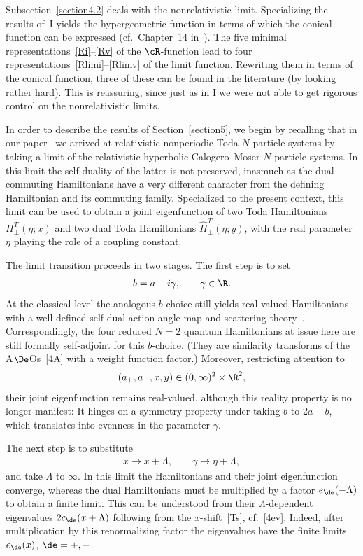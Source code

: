 \documentclass[pdftex]{sigma}
\numberwithin{equation}{section}
\begin{document}
Subsection~\ref{section4.2} deals with the nonrelativistic limit. Specializing the results of~I yields the hypergeometric function in terms of which the conical function can be expressed (cf.~Chapter~14 in~\cite{dlmf}). The f\/ive minimal representations~\eqref{Ri}--\eqref{Rv} of the $\cR$-function lead to four representations~\eqref{Rlimi}--\eqref{Rlimv} of the limit function. Rewriting them in terms of the conical function, three of these can be found in the literature (by looking rather hard). This is reassuring, since just as in I we were not able to get rigorous control on the nonrelativistic limits.

In order to describe the results of Section~\ref{section5}, we begin by recalling that in our paper~\cite{toda} we arrived at relativistic nonperiodic Toda $N$-particle systems by taking a limit of the relativistic hyperbolic Calogero--Moser $N$-particle systems. In this limit the self-duality of the latter is not preserved, inasmuch as the dual commuting Hamiltonians have a very dif\/ferent character from the def\/ining Hamiltonian and its commuting family. Specialized to the present context, this limit can be used to obtain a joint eigenfunction of two Toda Hamiltonians $H^{T}_{\pm}(\eta;x)$ and two dual Toda Hamiltonians $\hat{H}^{T}_{\pm}(\eta;y)$, with the real parameter $\eta$ playing the role of a coupling constant.

The limit transition proceeds in two stages. The f\/irst step is to set
\begin{gather}\label{gam}
b=a-i\gamma,\qquad \gamma\in\R.
\end{gather}
At the classical level the analogous $b$-choice still yields real-valued Hamiltonians with a well-def\/ined self-dual action-angle map and scattering theory~\cite{aa1}.  Correspondingly, the four reduced $N=2$ quantum Hamiltonians at issue here are still formally self-adjoint for this $b$-choice. (They are similarity transforms of the A$\De$Os~\eqref{4A} with a weight function factor.) Moreover, restricting attention to
\begin{gather}\label{real}
(a_{+},a_{-},x,y)\in(0,\infty)^2\times\R^2,
\end{gather}
their joint eigenfunction remains real-valued, although this reality property is no longer manifest: It hinges on a symmetry property under taking $b$ to $2a-b$, which translates into evenness in the parameter $\gamma$.

The next step is to substitute
\begin{gather}\label{Ts}
x\to x+\Lambda,\qquad \gamma\to \eta +\Lambda,
\end{gather}
and take $\Lambda$ to $\infty$. In this limit the Hamiltonians and their joint eigenfunction converge, whereas the dual Hamiltonians must be multiplied by a factor $e_{\de}(-\Lambda)$ to obtain a f\/inite limit. This can be understood from their $\Lambda$-dependent eigenvalues $2c_{\de}(x+\Lambda)$ following from the $x$-shift~\eqref{Ts}, cf.~\eqref{4ev}. Indeed, after multiplication by this renormalizing factor the eigenvalues have the f\/inite limits $e_{\de}(x)$, $\de=+,-$.
\end{document}
